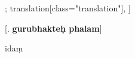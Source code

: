 \begin{alignment}[
  texts=edition[class="edition"];
  translation[class="translation"],
  ]
  \begin{edition}
    \centerline{\textrm{\small{[. \textbf{gurubhakteḥ phalam}]}}}
          \bigskip
    \begin{prose}
\noindent      
idaṃ

\end{prose}
\end{edition}
\end{alignment}
